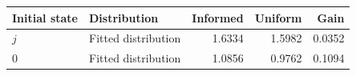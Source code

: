 \begin{tabular}{llrrr}\toprule
Initial state & Distribution & Informed & Uniform & Gain\\\midrule
$j$ & Fitted distribution & 1.6334 & 1.5982 & 0.0352 \\
$0$ & Fitted distribution & 1.0856 & 0.9762 & 0.1094 \\
\bottomrule\end{tabular}
